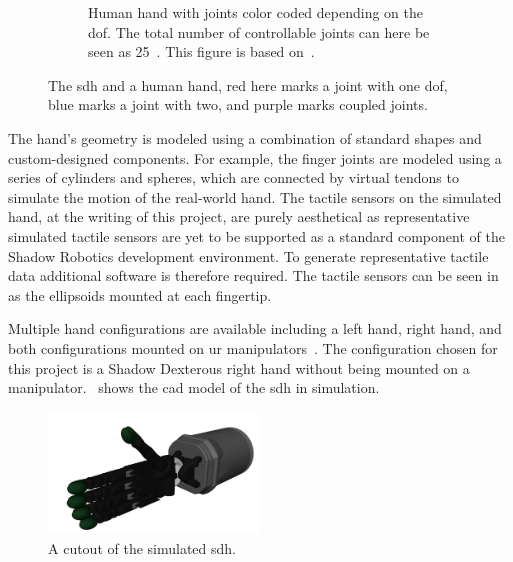 \begin{figure}[h]
\begin{subfigure}[b]{0.48\textwidth}
		\caption{Human hand with joints color coded depending on the \gls{dof}. The total number of controllable joints can here be seen as \num{25}~\cite{design-and-development-of-a-bilateral-therapeutic-hand-device-for-stroke-rehabilitation}. This figure is based on~\cite{svg-skeleton-hand}.}
		\label{fig:human-hand-skeleton}
	\end{subfigure}
	\caption{The \gls{sdh} and a human hand, red here marks a joint with one \gls{dof}, blue marks a joint with two, and purple marks coupled joints.}
	\label{fig:hands-dof}
\end{figure}

The hand's geometry is modeled using a combination of standard shapes and custom-designed components. For example, the finger joints are modeled using a series of cylinders and spheres, which are connected by virtual tendons to simulate the motion of the real-world hand. The tactile sensors on the simulated hand, at the writing of this project, are purely aesthetical as representative simulated tactile sensors are yet to be supported as a standard component of the Shadow Robotics development environment. To generate representative tactile data additional software is therefore required. The tactile sensors can be seen in  as the ellipsoids mounted at each fingertip. \medskip

Multiple hand configurations are available including a left hand, right hand, and both configurations mounted on \gls{ur} manipulators~\cite{shadow-hand-configurations}. The configuration chosen for this project is a Shadow Dexterous right hand without being mounted on a manipulator.~ shows the \gls{cad} model of the \gls{sdh} in simulation.

\begin{figure}[h]
	\begin{small}
		\begin{center}
			\includegraphics[width=0.5\textwidth]{chapters/system-setup/fig/simulation-robot-hand.png}
		\end{center}
		\caption{A cutout of the simulated \gls{sdh}.}
		\label{fig:simulated-robot-hand}
	\end{small}
\end{figure}
\newpage
